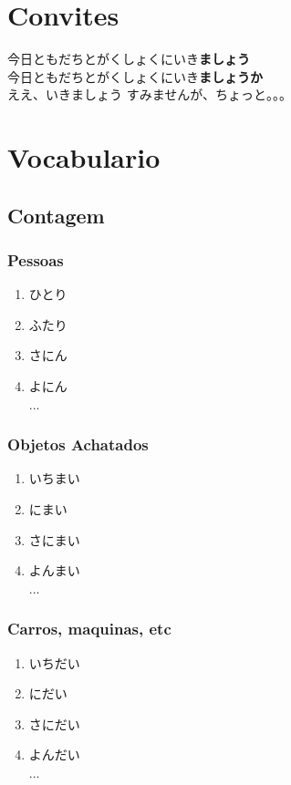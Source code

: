 \documentclass[a4paper, 12pt]{article}
\begin{document}
\section{Convites}
\begin{CJK}{UTF8}{min}
	今日ともだちとがくしょくにいき\textbf{ましょう}\\
	今日ともだちとがくしょくにいき\textbf{ましょうか}\\
	
	ええ、いきましょう
	すみませんが、ちょっと。。。
\end{CJK}





\newpage
\section{Vocabulario}
\subsection{Contagem}
\subsubsection{Pessoas}
\begin{CJK}{UTF8}{min}
	\begin{enumerate}
		\item ひとり
		\item ふたり
		\item さにん
		\item よにん\\...
	\end{enumerate}	
\end{CJK}

\subsubsection{Objetos Achatados}
\begin{CJK}{UTF8}{min}
	\begin{enumerate}
		\item いちまい
		\item にまい
		\item さにまい
		\item よんまい\\...
	\end{enumerate}	
\end{CJK}

\subsubsection{Carros, maquinas, etc}
\begin{CJK}{UTF8}{min}
	\begin{enumerate}
		\item いちだい
		\item にだい
		\item さにだい
		\item よんだい\\...
	\end{enumerate}	
\end{CJK}
\end{document}
